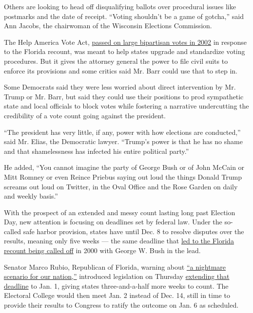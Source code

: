 Others are looking to head off disqualifying ballots over procedural
issues like postmarks and the date of receipt. ``Voting shouldn't be a
game of gotcha,'' said Ann Jacobs, the chairwoman of the Wisconsin
Elections Commission.

The Help America Vote Act,
\href{https://www.nytimes.com/2002/10/17/us/2002-campaign-ballot-overhaul-congress-passes-bill-clean-up-election-system.html}{passed
on large bipartisan votes in 2002} in response to the Florida recount,
was meant to help states upgrade and standardize voting procedures. But
it gives the attorney general the power to file civil suits to enforce
its provisions and some critics said Mr. Barr could use that to step in.

Some Democrats said they were less worried about direct intervention by
Mr. Trump or Mr. Barr, but said they could use their positions to prod
sympathetic state and local officials to block votes while fostering a
narrative undercutting the credibility of a vote count going against the
president.

``The president has very little, if any, power with how elections are
conducted,'' said Mr. Elias, the Democratic lawyer. ``Trump's power is
that he has no shame and that shamelessness has infected his entire
political party.''

He added, ``You cannot imagine the party of George Bush or of John
McCain or Mitt Romney or even Reince Priebus saying out loud the things
Donald Trump screams out loud on Twitter, in the Oval Office and the
Rose Garden on daily and weekly basis.''

With the prospect of an extended and messy count lasting long past
Election Day, new attention is focusing on deadlines set by federal law.
Under the so-called safe harbor provision, states have until Dec. 8 to
resolve disputes over the results, meaning only five weeks --- the same
deadline that
\href{https://www.nytimes.com/2000/12/13/us/bush-prevails-single-vote-justices-end-recount-blocking-gore-after-5-week.html}{led
to the Florida recount being called off} in 2000 with George W. Bush in
the lead.

Senator Marco Rubio, Republican of Florida, warning about
\href{https://medium.com/@SenatorMarcoRubio/americans-should-expect-election-chaos-7fa8a9ac5aa1}{``a
nightmare scenario for our nation,''} introduced legislation on Thursday
\href{https://www.rubio.senate.gov/public/_cache/files/7c86cdcc-19c2-4abd-9164-bacc5e66a499/27CC6B97AB3A0618568E38775DD4B657.mcg20709.pdf}{extending
that deadline} to Jan. 1, giving states three-and-a-half more weeks to
count. The Electoral College would then meet Jan. 2 instead of Dec. 14,
still in time to provide their results to Congress to ratify the outcome
on Jan. 6 as scheduled.

